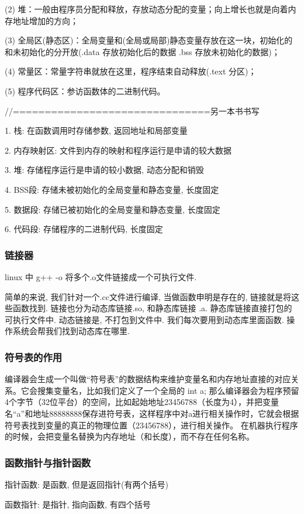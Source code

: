 (2) 堆：一般由程序员分配和释放，存放动态分配的变量；向上增长也就是向着内存地址增加的方向；

(3) 全局区(静态区)：全局变量和(全局或局部)静态变量存放在这一块，初始化的和未初始化的分开放(.data 存放初始化后的数据  .bss 存放未初始化的数据)；

(4) 常量区：常量字符串就放在这里，程序结束自动释放(.text 分区)；

(5) 程序代码区：参访函数体的二进制代码。


//===============================另一本书书写

1. 栈: 在函数调用时存储参数, 返回地址和局部变量

2. 内存映射区: 文件到内存的映射和程序运行是申请的较大数据

3. 堆: 存储程序运行是申请的较小数据, 动态分配和销毁

4. BSS段: 存储未被初始化的全局变量和静态变量, 长度固定

5. 数据段: 存储已被初始化的全局变量和静态变量, 长度固定

6. 代码段: 存储程序的二进制代码, 长度固定

\subsubsection{链接器}
linux 中 g++ -o 将多个.o文件链接成一个可执行文件.

简单的来说, 我们针对一个.cc文件进行编译, 当做函数申明是存在的, 链接就是将这些函数找到. 链接也分为动态库链接.so, 和静态库链接 .a. 静态库链接直接打包的可执行文件中. 动态链接是, 不打包到文件中. 我们每次要用到动态库里面函数. 操作系统会帮我们找到动态库在哪里.

\subsubsection{符号表的作用}
编译器会生成一个叫做“符号表”的数据结构来维护变量名和内存地址直接的对应关系。它会搜集变量名，比如我们定义了一个全局的 int a; 那么编译器会为程序预留4个字节（32位平台）的空间，比如起始地址23456788（长度为4），并把变量名“a”和地址88888888保存进符号表，这样程序中对a进行相关操作时，它就会根据符号表找到变量的真正的物理位置（23456788），进行相关操作。 在机器执行程序的时候，会把变量名替换为内存地址（和长度），而不存在任何名称。


\subsubsection{函数指针与指针函数}
指针函数: 是函数, 但是返回指针(有两个括号) \par
函数指针: 是指针, 指向函数, 有四个括号 \par
